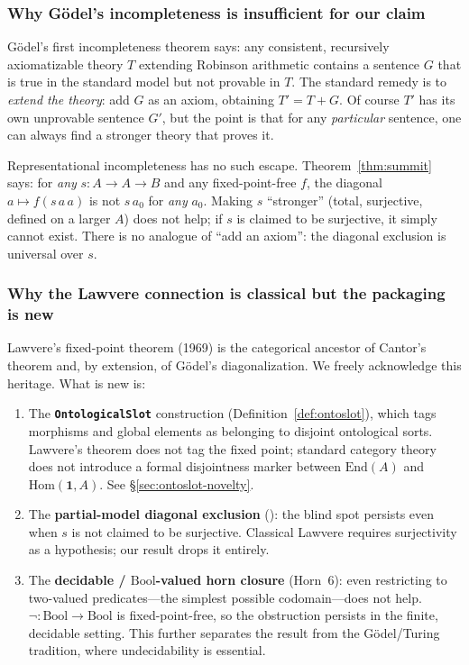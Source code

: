 \documentclass[11pt]{article}
\begin{document}
\subsubsection{Why G\"odel's incompleteness is insufficient for our claim}

G\"odel's first incompleteness theorem says: any consistent, recursively
axiomatizable theory $T$ extending Robinson arithmetic contains a sentence
$G$ that is true in the standard model but not provable in $T$.  The
standard remedy is to \emph{extend the theory}: add $G$ as an axiom,
obtaining $T' = T + G$.  Of course $T'$ has its own unprovable sentence
$G'$, but the point is that for any \emph{particular} sentence, one can
always find a stronger theory that proves it.

Representational incompleteness has no such escape.
Theorem~\ref{thm:summit} says: for \emph{any} $s : A \to A \to B$ and any
fixed-point-free $f$, the diagonal $a \mapsto f(s\,a\,a)$ is not $s\,a_0$
for \emph{any} $a_0$.  Making $s$ ``stronger'' (total, surjective, defined
on a larger $A$) does not help; if $s$ is claimed to be surjective, it
simply cannot exist.  There is no analogue of ``add an axiom'': the
diagonal exclusion is universal over $s$.

\subsubsection{Why the Lawvere connection is classical but the packaging is new}

Lawvere's fixed-point theorem (1969) is the categorical ancestor of
Cantor's theorem and, by extension, of G\"odel's diagonalization.  We
freely acknowledge this heritage.  What is new is:

\begin{enumerate}[label=(\alph*),itemsep=0.3ex]
\item The \textbf{\texttt{OntologicalSlot}} construction
  (Definition~\ref{def:ontoslot}), which tags morphisms and global
  elements as belonging to disjoint ontological sorts.  Lawvere's theorem
  does not tag the fixed point; standard category theory does not
  introduce a formal disjointness marker between $\mathrm{End}(A)$ and
  $\mathrm{Hom}(\mathbf{1}, A)$.  See
  \S\ref{sec:ontoslot-novelty}.
\item The \textbf{partial-model diagonal exclusion}
  (): the blind spot persists
  even when $s$ is not claimed to be surjective.  Classical Lawvere
  requires surjectivity as a hypothesis; our result drops it entirely.
\item The \textbf{decidable / $\mathrm{Bool}$-valued horn closure}
  (Horn~6): even restricting to two-valued predicates---the simplest
  possible codomain---does not help.
  $\lnot : \mathrm{Bool} \to \mathrm{Bool}$ is fixed-point-free, so
  the obstruction persists in the finite, decidable setting.  This
  further separates the result from the G\"odel/Turing tradition, where
  undecidability is essential.
\end{enumerate}
\end{document}
